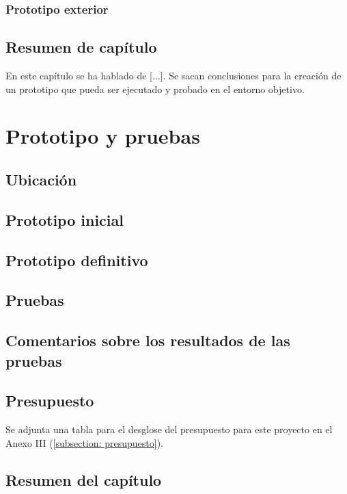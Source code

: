 \documentclass[12pt]{article}
\begin{document}
	\subsubsection{Prototipo exterior}
		
	\subsection[Resumen del capítulo]{Resumen de capítulo}
	
	En este capítulo se ha hablado de [...]. Se sacan conclusiones para la creación de un prototipo que pueda ser ejecutado y probado en el entorno objetivo.
	\pagebreak
	
	
	\section[Prototipo y pruebas]{Prototipo y pruebas}
	
	\subsection[Ubicación]{Ubicación}
	\subsection[Prototipo inicial]{Prototipo inicial}
	\subsection[Prototipo definitivo]{Prototipo definitivo}
	\subsection[Pruebas]{Pruebas}
	\subsection[Comentarios sobre los resultados de las pruebas]{Comentarios sobre los resultados de las pruebas}
	\subsection[Presupuesto]{Presupuesto}
	\noindent Se adjunta una tabla para el desglose del presupuesto para este proyecto en el Anexo III (\ref{subsection: presupuesto}).
	\subsection[Resumen del capítulo]{Resumen del capítulo}
	
\end{document}
